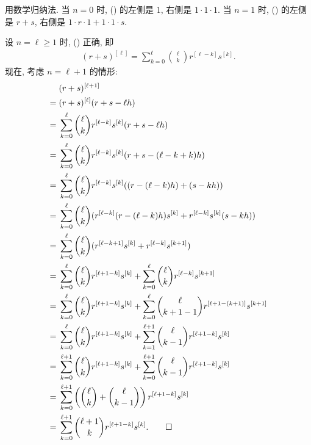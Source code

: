 \begin{pf}
    用数学归纳法. 当 $n = 0$ 时, (\myStar) 的左侧是 $1$, 右侧是 $1 \cdot 1 \cdot 1$. 当 $n = 1$ 时, (\myStar) 的左侧是 $r + s$, 右侧是 $1 \cdot r \cdot 1 + 1 \cdot 1 \cdot s$.

    设 $n = \ell \geq 1$ 时, (\myStar) 正确, 即
    \begin{align*}
        (r + s)^{[\ell]} = \sum_{k = 0}^{\ell} \binom{\ell}{k} r^{[\ell - k]} s^{[k]}. \tag*{(\myStar)}
    \end{align*}
    现在, 考虑 $n = \ell + 1$ 的情形:
    \begin{align*}
             & (r + s)^{[\ell + 1]}                                                                                                                              \\
        = {} & (r + s)^{[\ell]} (r + s - \ell h)                                                                                                                 \\
        = {} & \sum_{k = 0}^{\ell} \binom{\ell}{k} r^{[\ell - k]} s^{[k]} (r + s - \ell h)                                                                       \\
        = {} & \sum_{k = 0}^{\ell} \binom{\ell}{k} r^{[\ell - k]} s^{[k]} (r + s - (\ell - k + k) h)                                                             \\
        = {} & \sum_{k = 0}^{\ell} \binom{\ell}{k} r^{[\ell - k]} s^{[k]} ((r - (\ell - k) h) + (s - k h))                                                       \\
        = {} & \sum_{k = 0}^{\ell} \binom{\ell}{k} (r^{[\ell - k]} (r - (\ell - k) h) s^{[k]} + r^{[\ell - k]} s^{[k]} (s - k h))                                \\
        = {} & \sum_{k = 0}^{\ell} \binom{\ell}{k} (r^{[\ell - k + 1]} s^{[k]} + r^{[\ell - k]} s^{[k + 1]})                                                     \\
        = {} & \sum_{k = 0}^{\ell} \binom{\ell}{k} r^{[\ell + 1 - k]} s^{[k]} + \sum_{k = 0}^{\ell} \binom{\ell}{k} r^{[\ell - k]} s^{[k + 1]}                   \\
        = {} & \sum_{k = 0}^{\ell} \binom{\ell}{k} r^{[\ell + 1 - k]} s^{[k]} + \sum_{k = 0}^{\ell} \binom{\ell}{k + 1 - 1} r^{[\ell + 1 - (k + 1)]} s^{[k + 1]} \\
        = {} & \sum_{k = 0}^{\ell} \binom{\ell}{k} r^{[\ell + 1 - k]} s^{[k]} + \sum_{k = 1}^{\ell + 1} \binom{\ell}{k - 1} r^{[\ell + 1 - k]} s^{[k]}           \\
        = {} & \sum_{k = 0}^{\ell + 1} \binom{\ell}{k} r^{[\ell + 1 - k]} s^{[k]} + \sum_{k = 0}^{\ell + 1} \binom{\ell}{k - 1} r^{[\ell + 1 - k]} s^{[k]}       \\
        = {} & \sum_{k = 0}^{\ell + 1} \left( \binom{\ell}{k} + \binom{\ell}{k - 1} \right) r^{[\ell + 1 - k]} s^{[k]}                                           \\
        = {} & \sum_{k = 0}^{\ell + 1} \binom{\ell + 1}{k} r^{[\ell + 1 - k]} s^{[k]}. \qedhere
    \end{align*}
\end{pf}

